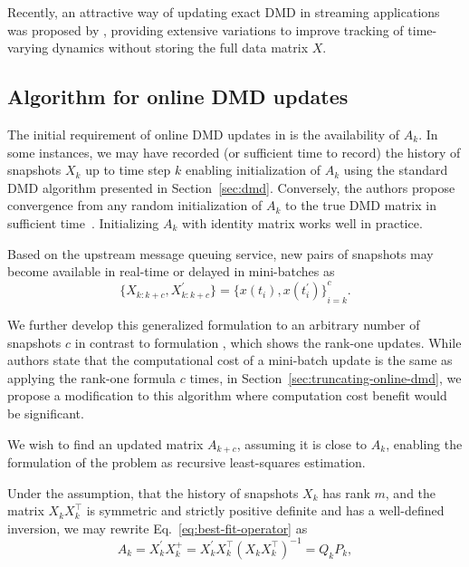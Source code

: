 Recently, an attractive way of updating exact DMD in streaming applications was proposed by \citet{Zhang2019}, providing extensive variations to improve tracking of time-varying dynamics without storing the full data matrix \(X\).

\subsection{Algorithm for online DMD updates}\label{sec:online-dmd-updates}
The initial requirement of online DMD updates in \citet{Zhang2019} is the availability of \(A_{k}\). In some instances, we may have recorded (or sufficient time to record) the history of snapshots \(X_k\) up to time step \(k\) enabling initialization of \(A_k\) using the standard DMD algorithm presented in Section~\ref{sec:dmd}. Conversely, the authors propose convergence from any random initialization of \(A_k\) to the true DMD matrix in sufficient time~\citep{Zhang2019}. Initializing \(A_k\) with identity matrix works well in practice.

Based on the upstream message queuing service, new pairs of snapshots may become available in real-time or delayed in mini-batches as
\begin{equation}
	\{X_{k : k + c}, X^\prime_{k : k + c}\} = {\{x(t_i), x(t_i^\prime )\}}^c_{i=k}.
\end{equation}

We further develop this generalized formulation to an arbitrary number of snapshots \(c\) in contrast to formulation \citet{Zhang2019}, which shows the rank-one updates. While authors state that the computational cost of a mini-batch update is the same as applying the rank-one formula \(c\) times, in Section~\ref{sec:truncating-online-dmd}, we propose a modification to this algorithm where computation cost benefit would be significant.

We wish to find an updated matrix \(A_{k+c}\), assuming it is close to \(A_{k}\), enabling the formulation of the problem as recursive least-squares estimation\citep{Zhang2019}.

Under the assumption, that the history of snapshots \(X_k\) has rank \(m\), and the matrix \(X_k X_k^\top \) is symmetric and strictly positive definite and has a well-defined inversion, we may rewrite Eq.~\eqref{eq:best-fit-operator} as
\begin{equation}\label{eq:pseudo-inverse}
	A_k = X^\prime_k X_k^+ = X^\prime_k X_k^\top {(X_k X_k^\top)}^{-1} = Q_k P_k,
\end{equation}

